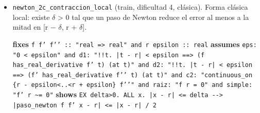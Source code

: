 \documentclass[11pt,a4paper]{article}
\begin{document}
\begin{itemize}
  {\footnotesize \textbf{fixes} \texttt{f f' f'{}' :\allowbreak{}:\allowbreak{} "real =\allowbreak{}> real" and r delta m M :\allowbreak{}:\allowbreak{} real and x :\allowbreak{}:\allowbreak{} real} \textbf{assumes} \texttt{d1:\allowbreak{} "!{}!t. |\allowbreak{}t -\allowbreak{} r|\allowbreak{} <=\allowbreak{} delta =\allowbreak{}=\allowbreak{}> (\allowbreak{}f has\_\allowbreak{}real\_\allowbreak{}derivative f' t) (\allowbreak{}at t)" and d2:\allowbreak{} "!{}!t. |\allowbreak{}t -\allowbreak{} r|\allowbreak{} <=\allowbreak{} delta =\allowbreak{}=\allowbreak{}> (\allowbreak{}f' has\_\allowbreak{}real\_\allowbreak{}derivative f'{}' t) (\allowbreak{}at t)" and raiz:\allowbreak{} "f r =\allowbreak{} 0" and m\_\allowbreak{}pos:\allowbreak{} "0 < m" and cota1:\allowbreak{} "!{}!t. |\allowbreak{}t -\allowbreak{} r|\allowbreak{} <=\allowbreak{} delta =\allowbreak{}=\allowbreak{}> m <=\allowbreak{} |\allowbreak{}f' t|\allowbreak{}" and cota2:\allowbreak{} "!{}!t. |\allowbreak{}t -\allowbreak{} r|\allowbreak{} <=\allowbreak{} delta =\allowbreak{}=\allowbreak{}> |\allowbreak{}f'{}' t|\allowbreak{} <=\allowbreak{} M" and delta\_\allowbreak{}pos:\allowbreak{} "0 < delta" and delta\_\allowbreak{}chico:\allowbreak{} "M *\allowbreak{} delta <=\allowbreak{} m" and hx:\allowbreak{} "|\allowbreak{}x -\allowbreak{} r|\allowbreak{} <=\allowbreak{} delta"} \textbf{shows} \texttt{|\allowbreak{}paso\_\allowbreak{}newton f f' x -\allowbreak{} r|\allowbreak{} <=\allowbreak{} |\allowbreak{}x -\allowbreak{} r|\allowbreak{} /\allowbreak{} 2}\par}
  \item \texttt{newton\_\allowbreak{}2c\_\allowbreak{}contraccion\_\allowbreak{}local} (train, dificultad 4, clásica). Forma clásica local: existe $\delta $ > 0 tal que un paso de Newton reduce el error al menos a la mitad en [r $-$ $\delta $, r + $\delta $].\\
  {\footnotesize \textbf{fixes} \texttt{f f' f'{}' :\allowbreak{}:\allowbreak{} "real =\allowbreak{}> real" and r epsilon :\allowbreak{}:\allowbreak{} real} \textbf{assumes} \texttt{eps:\allowbreak{} "0 < epsilon" and d1:\allowbreak{} "!{}!t. |\allowbreak{}t -\allowbreak{} r|\allowbreak{} < epsilon =\allowbreak{}=\allowbreak{}> (\allowbreak{}f has\_\allowbreak{}real\_\allowbreak{}derivative f' t) (\allowbreak{}at t)" and d2:\allowbreak{} "!{}!t. |\allowbreak{}t -\allowbreak{} r|\allowbreak{} < epsilon =\allowbreak{}=\allowbreak{}> (\allowbreak{}f' has\_\allowbreak{}real\_\allowbreak{}derivative f'{}' t) (\allowbreak{}at t)" and c2:\allowbreak{} "continuous\_\allowbreak{}on \{r -\allowbreak{} epsilon<..<r +\allowbreak{} epsilon\} f'{}'" and raiz:\allowbreak{} "f r =\allowbreak{} 0" and simple:\allowbreak{} "f' r \textasciitilde{}=\allowbreak{} 0"} \textbf{shows} \texttt{EX delta>0. ALL x. |\allowbreak{}x -\allowbreak{} r|\allowbreak{} <=\allowbreak{} delta -\allowbreak{}{}-\allowbreak{}{}> |\allowbreak{}paso\_\allowbreak{}newton f f' x -\allowbreak{} r|\allowbreak{} <=\allowbreak{} |\allowbreak{}x -\allowbreak{} r|\allowbreak{} /\allowbreak{} 2}\par}

\end{itemize}
\end{document}
